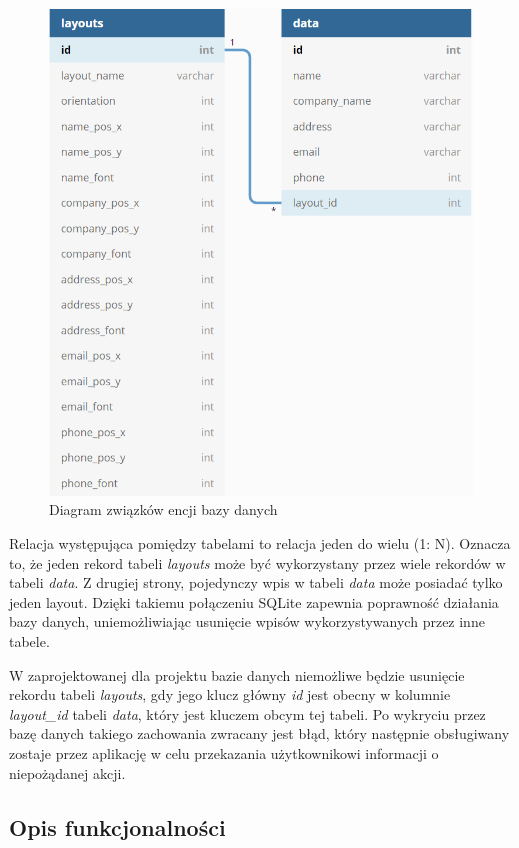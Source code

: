 \documentclass[a4paper,12pt, twoside]{article}
\begin{document}
        \begin{figure}[H]
    	        \centering
    			\includegraphics[width=12cm]{images/rys_11baza.png}
    			\caption{Diagram związków encji bazy danych}
                \label{fig:database}
    	\end{figure}
    	
        Relacja występująca pomiędzy tabelami to relacja jeden do wielu (1: N). Oznacza to, że jeden rekord tabeli \textit{layouts} może być wykorzystany przez wiele rekordów w tabeli \textit{data}. Z drugiej strony, pojedynczy wpis w tabeli \textit{data} może posiadać tylko jeden layout. Dzięki takiemu połączeniu SQLite zapewnia poprawność działania bazy danych, uniemożliwiając usunięcie wpisów wykorzystywanych przez inne tabele. 
        
        W zaprojektowanej dla projektu bazie danych niemożliwe będzie usunięcie rekordu tabeli \textit{layouts}, gdy jego klucz główny \textit{id} jest obecny w kolumnie \textit{layout\_id} tabeli \textit{data}, który jest kluczem obcym tej tabeli. Po wykryciu przez bazę danych takiego zachowania zwracany jest błąd, który następnie obsługiwany zostaje przez aplikację w celu przekazania użytkownikowi informacji o niepożądanej akcji.
        
        \subsection{Opis funkcjonalności}
    	
\end{document}
